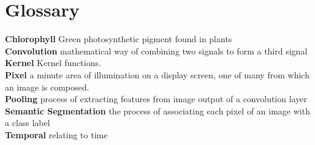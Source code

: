 \documentclass[12pt, a4paper]{report}
\begin{document}
\section*{Glossary}
\vspace*{0.5cm}
\textbf{Chlorophyll} Green photosynthetic pigment found in plants\\
\textbf{Convolution} mathematical way of combining two signals to form a third signal\\
\textbf{Kernel} Kernel functions.\\
\textbf{Pixel} a minute area of illumination on a display screen, one of many from which an image is composed.\\
\textbf{Pooling} process of extracting features from image output of a convolution layer\\
\textbf{Semantic Segmentation} the process of associating each pixel of an image with a class label\\
\textbf{Temporal} relating to time\\
\end{document}
